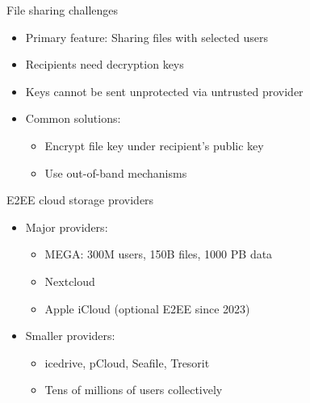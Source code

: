 \documentclass[aspectratio=169, lualatex, handout]{beamer}
\begin{document}
\begin{frame}{File sharing challenges}
	\begin{itemize}
		\item Primary feature: Sharing files with selected users
		\item Recipients need decryption keys
		\item Keys cannot be sent unprotected via untrusted provider
		\item Common solutions:
		      \begin{itemize}
			      \item Encrypt file key under recipient's public key
			      \item Use out-of-band mechanisms
		      \end{itemize}
	\end{itemize}
\end{frame}

\begin{frame}{E2EE cloud storage providers}
	\begin{itemize}
		\item Major providers:
		      \begin{itemize}
			      \item MEGA: 300M users, 150B files, 1000 PB data
			      \item Nextcloud
			      \item Apple iCloud (optional E2EE since 2023)
		      \end{itemize}
		\item Smaller providers:
		      \begin{itemize}
			      \item icedrive, pCloud, Seafile, Tresorit
			      \item Tens of millions of users collectively
		      \end{itemize}
	\end{itemize}
\end{frame}
\end{document}
